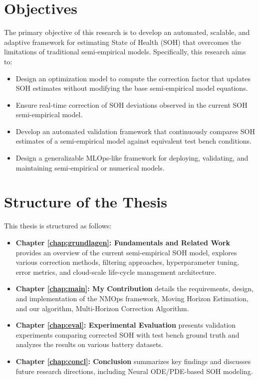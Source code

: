 \section{Objectives}
The primary objective of this research is to develop an automated, scalable, and adaptive framework for estimating State of Health (SOH) that overcomes the limitations of traditional semi-empirical models. Specifically, this research aims to:
\begin{itemize}
    \item Design an optimization model to compute the correction factor that updates SOH estimates without modifying the base semi-empirical model equations.
    \item Ensure real-time correction of SOH deviations observed in the current SOH semi-empirical model.
    \item Develop an automated validation framework that continuously compares SOH estimates of a semi-empirical model against equivalent test bench conditions.
    \item Design a generalizable MLOps-like framework for deploying, validating, and maintaining semi-empirical or numerical models.
\end{itemize}

\section{Structure of the Thesis}
This thesis is structured as follows:
\begin{itemize}
    \item \textbf{Chapter \ref{chap:grundlagen}: Fundamentals and Related Work} provides an overview of the current semi-empirical SOH model, explores various correction methods, filtering approaches, hyperparameter tuning, error metrics, and cloud-scale life-cycle management architecture.
    \item \textbf{Chapter \ref{chap:main}: My Contribution} details the requirements, design, and implementation of the NMOps framework, Moving Horizon Estimation, and our algorithm, Multi-Horizon Correction Algorithm.
    \item \textbf{Chapter \ref{chap:eval}: Experimental Evaluation} presents validation experiments comparing corrected SOH with test bench ground truth and analyzes the results on various battery datasets.
    \item \textbf{Chapter \ref{chap:concl}: Conclusion} summarizes key findings and discusses future research directions, including Neural ODE/PDE-based SOH modeling.
\end{itemize}